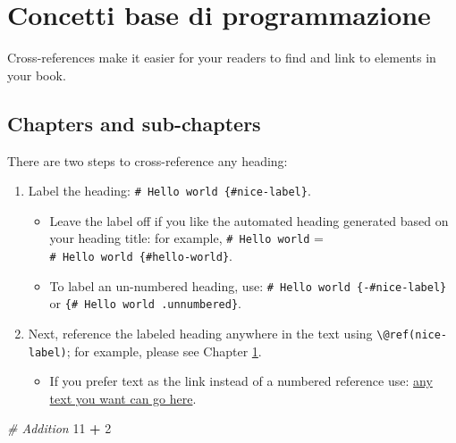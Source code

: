 \documentclass[
]{book}
\newenvironment{Shaded}{\begin{snugshade}}{\end{snugshade}}
\newcommand{\CommentTok}[1]{\textcolor[rgb]{0.56,0.35,0.01}{\textit{#1}}}
\newcommand{\DecValTok}[1]{\textcolor[rgb]{0.00,0.00,0.81}{#1}}
\newcommand{\SpecialCharTok}[1]{\textcolor[rgb]{0.81,0.36,0.00}{\textbf{#1}}}
\providecommand{\tightlist}{%
  \setlength{\itemsep}{0pt}\setlength{\parskip}{0pt}}
\theoremstyle{definition}
\theoremstyle{definition}
\theoremstyle{definition}
\theoremstyle{definition}
\theoremstyle{remark}
\begin{document}
\hypertarget{cross}{%
\chapter{Concetti base di programmazione}\label{cross}}

Cross-references make it easier for your readers to find and link to elements in your book.

\hypertarget{chapters-and-sub-chapters}{%
\section{Chapters and sub-chapters}\label{chapters-and-sub-chapters}}

There are two steps to cross-reference any heading:

\begin{enumerate}
\def\labelenumi{\arabic{enumi}.}
\tightlist
\item
  Label the heading: \texttt{\#\ Hello\ world\ \{\#nice-label\}}.

  \begin{itemize}
  \tightlist
  \item
    Leave the label off if you like the automated heading generated based on your heading title: for example, \texttt{\#\ Hello\ world} = \texttt{\#\ Hello\ world\ \{\#hello-world\}}.
  \item
    To label an un-numbered heading, use: \texttt{\#\ Hello\ world\ \{-\#nice-label\}} or \texttt{\{\#\ Hello\ world\ .unnumbered\}}.
  \end{itemize}
\item
  Next, reference the labeled heading anywhere in the text using \texttt{\textbackslash{}@ref(nice-label)}; for example, please see Chapter \ref{cross}.

  \begin{itemize}
  \tightlist
  \item
    If you prefer text as the link instead of a numbered reference use: \protect\hyperlink{cross}{any text you want can go here}.
  \end{itemize}
\end{enumerate}

\begin{Shaded}
\begin{Highlighting}[]
\CommentTok{\# Addition}
\DecValTok{11} \SpecialCharTok{+} \DecValTok{2}
\end{Highlighting}
\end{Shaded}
\end{document}
